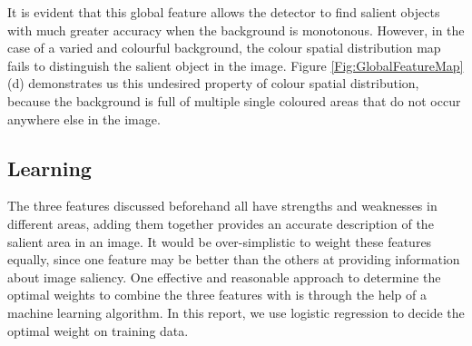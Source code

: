 \documentclass[10pt,twocolumn,letterpaper]{article}
\begin{document}
It is evident that this global feature allows the detector to find salient objects with much greater accuracy when the background is monotonous. However, in the case of a varied and colourful background, the colour spatial distribution map fails to distinguish the salient object in the image. Figure \ref{Fig:GlobalFeatureMap} (d) demonstrates us this undesired property of colour spatial distribution, because the background is full of multiple single coloured areas that do not occur anywhere else in the image.








\newcommand{\bl}{\boldsymbol{\lambda}}
\newcommand{\bt}{\boldsymbol{t}}
\newcommand{\btx}{\boldsymbol{t}_x}
\newcommand{\bphix}{\boldsymbol{\phi}_x}

\subsection{Learning}
The three features discussed beforehand all have strengths and weaknesses in different areas, adding them together provides an accurate description of the salient area in an image.  It would be over-simplistic to weight these features equally, since one feature may be better than the others at providing information about image saliency. One effective and reasonable approach to determine the optimal weights to combine the three features with is through the help of a machine learning algorithm.  In this report, we use logistic regression to decide the optimal weight on training data.
\end{document}

